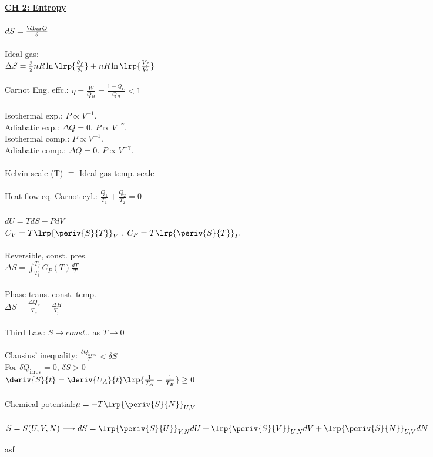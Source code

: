 \begin{multicols}{3}
\underline{\textbf{CH 2: Entropy}} \\ \\ $dS = \frac{\dbar Q}{\theta}$ \\ \\ Ideal gas: \\ $\Delta S = \frac{3}{2}nR\ln\lrp{\frac{\theta_f}{\theta_i}}+nR\ln\lrp{\frac{V_f}{V_i}}$ \\ \\
Carnot Eng. effc.: $\eta = \frac{W}{Q_H}=\frac{1 - Q_C}{Q_H} < 1$\\ \\
Isothermal exp.: $P\propto V^{-1}$. \\
Adiabatic exp.: $\Delta Q=0$. $P\propto V^{-\gamma}$. \\
Isothermal comp.: $P\propto V^{-1}$. \\
Adiabatic comp.: $\Delta Q = 0$. $P\propto V^{-\gamma}$.  \\ \\
Kelvin scale (T) $\equiv$ Ideal gas temp. scale \\ \\
Heat flow eq. Carnot cyl.:  $\frac{Q_1}{T_1} + \frac{Q_2}{T_2} = 0$ \\ \\
$dU = TdS - PdV$ \\
$C_V = T\lrp{\periv{S}{T}}_V$ , $C_P = T\lrp{\periv{S}{T}}_P$ \\ \\
Reversible, const. pres.\\
$\Delta S = \int_{T_i}^{T_f}C_P(T)\frac{dT}{T}$ \\ \\
Phase trans. const. temp.\\
$\Delta S = \frac{\Delta Q_p}{T_p}=\frac{\Delta H}{T_p}$ \\ \\
Third Law: $S \longrightarrow const.$, as $T \longrightarrow 0$ \\ \\
Clausius' inequality: $\frac{\delta Q_\text{irrev}}{T} < \delta S$ \\
For $\delta Q_\text{irrev} = 0$, $\delta S>0$ \\
$\deriv{S}{t} = \deriv{U_A}{t}\lrp{\frac{1}{T_A}-\frac{1}{T_B}}\geq 0$ \\ \\
Chemical potential:$\mu = -T\lrp{\periv{S}{N}}_{U,V}$ \\ \\
$S=S(U,V,N) \longrightarrow  \\dS = \lrp{\periv{S}{U}}_{V,N} dU + \lrp{\periv{S}{V}}_{U,N}dV + \lrp{\periv{S}{N}}_{U,V}dN $



\columnbreak

asf



\end{multicols}






\restoregeometry 
